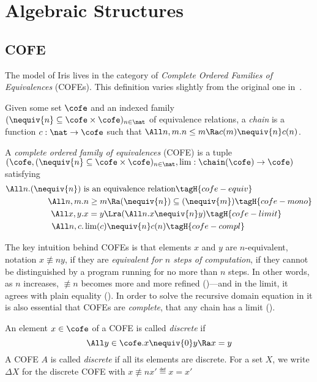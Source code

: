\section{Algebraic Structures}

\subsection{COFE}

The model of Iris lives in the category of \emph{Complete Ordered Families of Equivalences} (COFEs).
This definition varies slightly from the original one in~\cite{catlogic}.

\begin{defn}[Chain]
  Given some set $\cofe$ and an indexed family $({\nequiv{n}} \subseteq \cofe \times \cofe)_{n \in \nat}$ of equivalence relations, a \emph{chain} is a function $c : \nat \to \cofe$ such that $\All n, m. n \leq m \Ra c (m) \nequiv{n} c (n)$.
\end{defn}

\begin{defn}
  A \emph{complete ordered family of equivalences} (COFE) is a tuple $(\cofe, ({\nequiv{n}} \subseteq \cofe \times \cofe)_{n \in \nat}, \lim : \chain(\cofe) \to \cofe)$ satisfying
  \begin{align*}
    \All n. (\nequiv{n}) ~& \text{is an equivalence relation} \tagH{cofe-equiv} \\
    \All n, m.& n \geq m \Ra (\nequiv{n}) \subseteq (\nequiv{m}) \tagH{cofe-mono} \\
    \All x, y.& x = y \Lra (\All n. x \nequiv{n} y) \tagH{cofe-limit} \\
    \All n, c.& \lim(c) \nequiv{n} c(n) \tagH{cofe-compl}
  \end{align*}
\end{defn}

The key intuition behind COFEs is that elements $x$ and $y$ are $n$-equivalent, notation $x \nequiv{n} y$, if they are \emph{equivalent for $n$ steps of computation}, \ie if they cannot be distinguished by a program running for no more than $n$ steps.
In other words, as $n$ increases, $\nequiv{n}$ becomes more and more refined ()---and in the limit, it agrees with plain equality ().
In order to solve the recursive domain equation in  it is also essential that COFEs are \emph{complete}, \ie that any chain has a limit ().

\begin{defn}
  An element $x \in \cofe$ of a COFE is called \emph{discrete} if
  \[ \All y \in \cofe. x \nequiv{0} y \Ra x = y\]
  A COFE $A$ is called \emph{discrete} if all its elements are discrete.
  For a set $X$, we write $\Delta X$ for the discrete COFE with $x \nequiv{n} x' \eqdef x = x'$

\end{defn}

